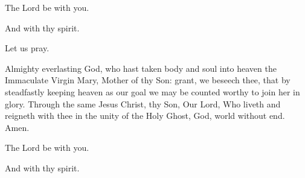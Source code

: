 


\rubric{\Vbar}The Lord be with you.

\rubric{\Rbar}And with thy spirit.

Let us pray.

Almighty everlasting God, who hast taken body and soul into heaven the Immaculate Virgin Mary, Mother of thy Son: grant, we beseech thee, that by steadfastly keeping heaven as our goal we may be counted worthy to join her in glory. Through the same Jesus Christ, thy Son, Our Lord, Who liveth and reigneth with thee in the unity of the Holy Ghost, God, world without end. \rubric{\Rbar} Amen.

\rubric{\Vbar}The Lord be with you.

\rubric{\Rbar}And with thy spirit.
